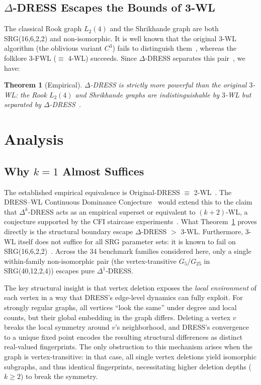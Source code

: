 \documentclass[11pt,a4paper]{article}
\newtheorem{theorem}{Theorem}
\begin{document}
\subsection{$\Delta$-DRESS Escapes the Bounds of 3-WL}
\label{sec:3wl-counterexample}

The classical Rook graph $L_2(4)$ and the Shrikhande graph are both SRG(16,6,2,2) and non-isomorphic.
It is well known that the original 3-WL algorithm (the oblivious variant $C^3$) fails to distinguish them~\cite{cai1992optimal}, whereas the folklore 3-FWL ($\equiv$ 4-WL) succeeds.
Since $\Delta$-DRESS separates this pair~\cite{castrillo2026dress}, we have:

\begin{theorem}[Empirical]
\label{thm:3wl}
$\Delta$-DRESS is strictly more powerful than the original $3$-WL: the Rook $L_2(4)$ and Shrikhande graphs are indistinguishable by $3$-WL but separated by $\Delta$-DRESS~\cite{castrillo2026dress}.
\end{theorem}


\section{Analysis}

\subsection{Why \texorpdfstring{$k = 1$}{k=1} Almost Suffices}

The established empirical equivalence is Original-DRESS $\equiv$ 2-WL~\cite{castrillo2026dress}.
The DRESS--WL Continuous Dominance Conjecture~\cite{castrillo2026dress} would extend this to the claim that $\Delta^k$-DRESS acts as an empirical superset or equivalent to $(k{+}2)$-WL, a conjecture supported by the CFI staircase experiments~\cite{castrillo2026dress}.  What Theorem~\ref{thm:3wl} proves directly is the structural boundary escape $\Delta$-DRESS $>$ 3-WL.
Furthermore, 3-WL itself does not suffice for all SRG parameter sets: it is known to fail on SRG(16,6,2,2)~\cite{cai1992optimal}.
Across the 34 benchmark families considered here, only a single within-family non-isomorphic pair (the vertex-transitive $G_5$/$G_{25}$ in SRG(40,12,2,4)) escapes pure $\Delta^1$-DRESS.

The key structural insight is that vertex deletion exposes the \emph{local environment} of each vertex in a way that DRESS's edge-level dynamics can fully exploit.
For strongly regular graphs, all vertices ``look the same'' under degree and local counts, but their global embedding in the graph differs.
Deleting a vertex $v$ breaks the local symmetry around $v$'s neighborhood, and DRESS's convergence to a unique fixed point encodes the resulting structural differences as distinct real-valued fingerprints.
The only obstruction to this mechanism arises when the graph is vertex-transitive: in that case, all single vertex deletions yield isomorphic subgraphs, and thus identical fingerprints, necessitating higher deletion depths ($k \ge 2$) to break the symmetry.
\end{document}
